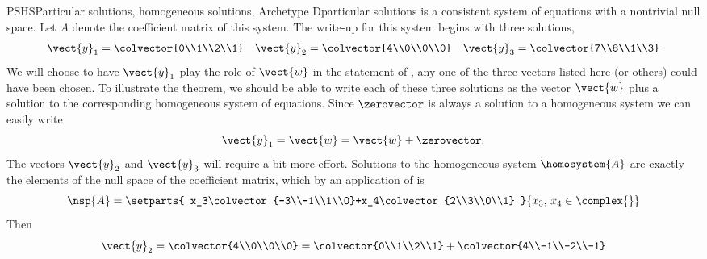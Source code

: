 \begin{example}{PSHS}{Particular solutions, homogeneous solutions, Archetype D}{particular solutions}
 is a consistent system of equations with a nontrivial null space.  Let $A$ denote the coefficient matrix of this system.  The write-up for this system begins with three solutions,
%
\begin{align*}
\vect{y}_1=\colvector{0\\1\\2\\1}&&
\vect{y}_2=\colvector{4\\0\\0\\0}&&
\vect{y}_3=\colvector{7\\8\\1\\3}
\end{align*}
%
We will choose to have $\vect{y}_1$ play the role of $\vect{w}$ in the statement of , any one of the three vectors listed here (or others) could have been chosen.   To illustrate the theorem, we should be able to write each of these three solutions as the vector $\vect{w}$ plus a solution to the corresponding homogeneous system of equations.  Since $\zerovector$ is always a solution to a homogeneous system we can easily write
%
\begin{equation*}
\vect{y}_1=\vect{w}=\vect{w}+\zerovector.
\end{equation*}
%
The vectors $\vect{y}_2$ and $\vect{y}_3$ will require a bit more effort.  Solutions to the homogeneous system $\homosystem{A}$ are exactly the elements of the null space of the coefficient matrix, which by an application of  is
%
\begin{equation*}
\nsp{A}=\setparts{
x_3\colvector{-3\\-1\\1\\0}+x_4\colvector{2\\3\\0\\1}
}{
x_3,\,x_4\in\complex{\null}
}
\end{equation*}
%
Then
%
\begin{equation*}
\vect{y}_2=\colvector{4\\0\\0\\0}
=\colvector{0\\1\\2\\1}+\colvector{4\\-1\\-2\\-1}

\end{equation*}
\end{example}
